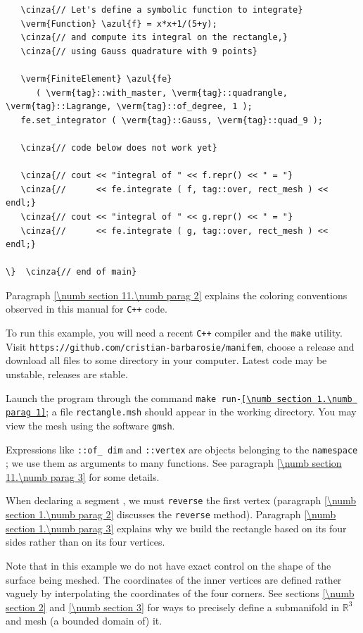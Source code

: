 \begin{Verbatim}
   \cinza{// Let's define a symbolic function to integrate}
   \verm{Function} \azul{f} = x*x+1/(5+y);
   \cinza{// and compute its integral on the rectangle,}
   \cinza{// using Gauss quadrature with 9 points}

   \verm{FiniteElement} \azul{fe}
      ( \verm{tag}::with_master, \verm{tag}::quadrangle, \verm{tag}::Lagrange, \verm{tag}::of_degree, 1 );
   fe.set_integrator ( \verm{tag}::Gauss, \verm{tag}::quad_9 );

   \cinza{// code below does not work yet}

   \cinza{// cout << "integral of " << f.repr() << " = "}
   \cinza{//      << fe.integrate ( f, tag::over, rect_mesh ) << endl;}
   \cinza{// cout << "integral of " << g.repr() << " = "}
   \cinza{//      << fe.integrate ( g, tag::over, rect_mesh ) << endl;}

\}  \cinza{// end of main}
\end{Verbatim}

Paragraph \ref{\numb section 11.\numb parag 2} explains the coloring conventions observed
in this manual for {\tt C++} code.

To run this example, you will need a recent {\tt C++} compiler and the {\tt make} utility.
Visit {\small\tt https://github.com/cristian-barbarosie/manifem}, choose a release
and download all files to some directory in your computer.
Latest code may be unstable, releases are stable.

Launch the program through the command
{\small\tt make run-\ref{\numb section 1.\numb parag 1}};
a file {\small\tt rectangle.msh} should appear in the working directory.
You may view the mesh using the software {\tt gmsh}.

Expressions like {\small\tt {}::of\_\,dim} and {\small\tt {}::vertex} are
objects belonging to the {\small\tt namespace };
we use them as arguments to many functions.
See paragraph \ref{\numb section 11.\numb parag 3} for some details.

When declaring a segment {\small\tt {}}, we must {\small\tt reverse} the first vertex
(paragraph \ref{\numb section 1.\numb parag 2} discusses the {\small\tt reverse} method).
Paragraph \ref{\numb section 1.\numb parag 3} explains why we build
the rectangle based on its four sides rather than on its four vertices.

Note that in this example we do not have exact control on the shape of the surface being meshed.
The coordinates of the inner vertices are defined rather vaguely by interpolating the
coordinates of the four corners.
See sections \ref{\numb section 2} and \ref{\numb section 3} for ways to precisely define
a submanifold in $ \mathbb{R}^3 $ and mesh (a bounded domain of) it.


